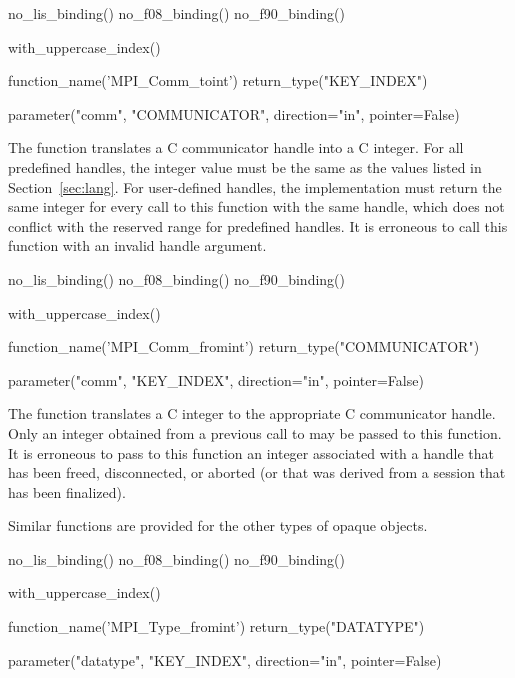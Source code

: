 \begin{mpi-binding}
    no_lis_binding()
    no_f08_binding()
    no_f90_binding()

    with_uppercase_index()

    function_name('MPI_Comm_toint')
    return_type("KEY_INDEX")

    parameter("comm", "COMMUNICATOR", direction="in", pointer=False)
\end{mpi-binding}

The function 
translates a C communicator handle into a C integer.
For all predefined handles, the integer value must be
the same as the values listed in Section~\ref{sec:lang}.
For user-defined handles, the implementation must
return the same integer for every call to this function with the same handle,
which does not conflict with the reserved range for predefined handles.
It is erroneous to call this function with an invalid handle argument.

\begin{mpi-binding}
    no_lis_binding()
    no_f08_binding()
    no_f90_binding()

    with_uppercase_index()

    function_name('MPI_Comm_fromint')
    return_type("COMMUNICATOR")

    parameter("comm", "KEY_INDEX", direction="in", pointer=False)
\end{mpi-binding}

The function  translates a C integer
to the appropriate C communicator handle.
Only an integer obtained from a previous call to 
may be passed to this function.
It is erroneous to pass to this function an integer associated
with a handle that has been freed, disconnected, or aborted (or that was derived from a session that has been finalized).

Similar functions are provided for the other types of opaque objects.

\bindingislisttrue
\begin{mpi-binding}
    no_lis_binding()
    no_f08_binding()
    no_f90_binding()

    with_uppercase_index()

    function_name('MPI_Type_fromint')
    return_type("DATATYPE")

    parameter("datatype", "KEY_INDEX", direction="in", pointer=False)
\end{mpi-binding}

